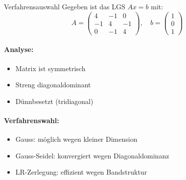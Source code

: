 \begin{example2}{Verfahrensauswahl}
Gegeben ist das LGS $Ax = b$ mit:
$$A = \begin{pmatrix} 
4 & -1 & 0 \\
-1 & 4 & -1 \\
0 & -1 & 4
\end{pmatrix}, \quad b = \begin{pmatrix} 1 \\ 0 \\ 1 \end{pmatrix}$$

\paragraph{Analyse:}
\begin{itemize}
    \item Matrix ist symmetrisch
    \item Streng diagonaldominant
    \item Dünnbesetzt (tridiagonal)
\end{itemize}

\paragraph{Verfahrenswahl:}
\begin{itemize}
    \item Gauss: möglich wegen kleiner Dimension
    \item Gauss-Seidel: konvergiert wegen Diagonaldominanz
    \item LR-Zerlegung: effizient wegen Bandstruktur
\end{itemize}
\end{example2}

